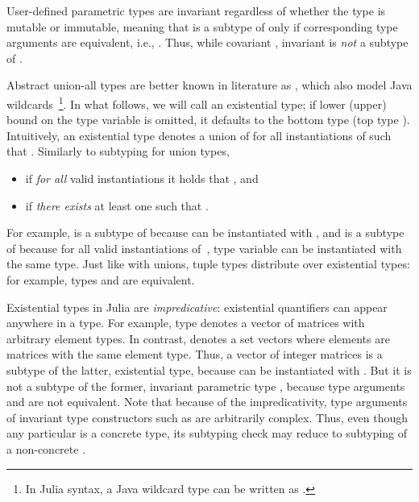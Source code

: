 User-defined parametric types are invariant regardless of whether the type is
mutable or immutable, meaning that  is a subtype of 
 only if corresponding type arguments are equivalent,
i.e., .
Thus, while covariant ,
invariant  is \emph{not}
a subtype of .

Abstract union-all types  are better known
in literature as , which also model
Java wildcards~\cite{TODO}\footnote{In Julia syntax, a Java wildcard type
 can be written as .}.
In what follows, we will call  an existential type;
if lower (upper) bound on the type variable is omitted, it defaults to the
bottom type  (top type ).
Intuitively, an existential type denotes a union of  for all
instantiations of  such that .
Similarly to subtyping for union types,
\begin{itemize}
  \item {} if \emph{for all} valid instantiations
     it holds that , and
  \item {} if \emph{there exists} at least one 
     such that .
\end{itemize}
For example,  is a subtype of  because  can be instantiated with ,
and  is a subtype of
 because for all valid instantiations of~,
type variable  can be instantiated with the same type.
Just like with unions, tuple types distribute over existential types:
for example, types 
and  are equivalent.

Existential types in Julia are \emph{impredicative}:
existential quantifiers can appear anywhere in a type.
For example, type  denotes a vector
of matrices with arbitrary element types.
In contrast,  denotes a set vectors where
elements are matrices with the same element type.
Thus, a vector of integer matrices  is a subtype
of the latter, existential type, because  can be instantiated with
. But it is not a subtype of the former, invariant parametric type
, because type arguments 
and  are not equivalent.
Note that because of the impredicativity, type arguments of invariant type
constructors such as  are arbitrarily complex. Thus, even though any
particular  is a concrete type, its subtyping check may reduce
to subtyping of a non-concrete .

